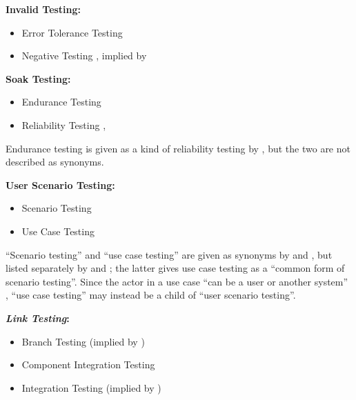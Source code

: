 \item \textbf{Invalid Testing:}
\begin{itemize}
	\item Error Tolerance Testing \citep[p.~45]{Kam2008}
	\item Negative Testing \cite{ISTQB}, implied by \cite[p.~10]{IEEE2021}
\end{itemize}
\item \textbf{Soak Testing:}
\begin{itemize}
	\item Endurance Testing \citep[p.~39]{IEEE2021}
	\item Reliability Testing \cite[Tab.~1,~p.~26]{Gerrard2000b}, \cite[Tab.~2]{Gerrard2000a}
\end{itemize}
Endurance testing is given as a kind of reliability testing by
\cite[p.~55]{Firesmith2015}, but the two are not described as synonyms.
\item \textbf{User Scenario Testing:}
\begin{itemize}
	\item Scenario Testing \cite{ISTQB}
	\item Use Case Testing \cite[p.~48]{Kam2008}
\end{itemize}
``Scenario testing'' and ``use case testing'' are given as synonyms
by \cite{ISTQB} and \cite[pp.~47-49]{Kam2008}, but listed
separately by \cite[p.~22]{IEEE2022} and \cite[p.~20]{IEEE2021}; the
latter gives use case testing as a ``common form of scenario testing''.
Since the actor in a use case ``can be a user or another system''
\citep[p.~20]{IEEE2021}, ``use case testing'' may instead be a child of
``user scenario testing''.
\item \textbf{\emph{Link Testing}:}
\begin{itemize}
	\item Branch Testing (implied by \cite[p.~24]{IEEE2021})
	\item Component Integration Testing \cite[p.~45]{Kam2008}
	\item Integration Testing (implied by \cite[p.~13]{Gerrard2000a})
\end{itemize}